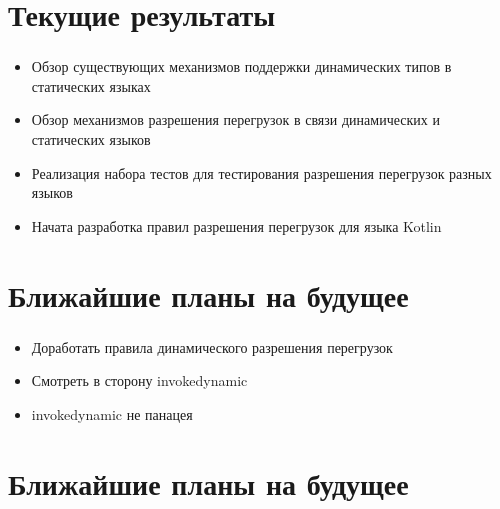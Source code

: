 \documentclass[t]{beamer}  %
\newcommand{\questionframe}[2]{
    \frame[c,plain]{
        \centering\huge
        \textbf{\structure{#1}}
        \par\bigskip
        #2
    }
}
\begin{document}
\section{Текущие результаты}
\begin{frame}
	\frametitle{\insertsection} 
    \begin{block}{}
		\begin{itemize}
		\item Обзор существующих механизмов поддержки динамических типов в статических языках
        \item Обзор механизмов разрешения перегрузок в связи динамических и статических языков
        \item Реализация набора тестов для тестирования разрешения перегрузок разных языков
        \item Начата разработка правил разрешения перегрузок для языка Kotlin
		\end{itemize}
	\end{block}
\end{frame}

\section{Ближайшие планы на будущее}
\begin{frame}
	\frametitle{\insertsection} 
    \begin{block}{}
		\begin{itemize}
        \item Доработать правила динамического разрешения перегрузок
		\item Смотреть в сторону invokedynamic
        \item invokedynamic не панацея
		\end{itemize}
	\end{block}
\end{frame}


\section{Ближайшие планы на будущее}

\questionframe{Вопросы? }{}
\end{document}
